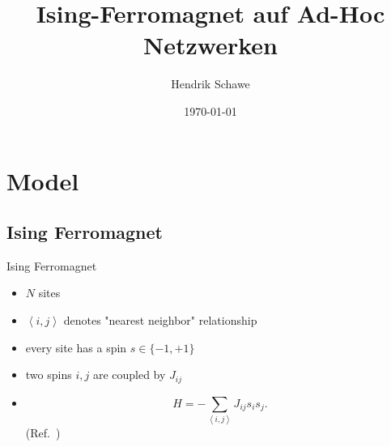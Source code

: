 \documentclass{beamer}
\title{Ising-Ferromagnet auf Ad-Hoc Netzwerken}
\author{Hendrik Schawe}
\date{\today}
\newcommand{\avg}[1]{\left< #1 \right>}
\begin{document}
\maketitle
\frame{\tableofcontents[pausesections]}

\section{Model}
    \subsection{Ising Ferromagnet}
        \begin{frame}{Ising Ferromagnet}
            \begin{itemize}[<+->]
                \item \(N\) sites
                \item \(\avg{i,j}\) denotes "nearest neighbor" relationship
                \item every site has a spin \(s \in \{-1,+1\}\){}
                \item two spins \(i,j\) are coupled by \(J_{ij}\)
                \item{
                    \begin{equation}
                        H = - \sum_{\avg{i,j}}J_{ij}s_{i}s_{j}.
                    \end{equation}
                    (Ref.\ \cite{Ising1925})
                }
            \end{itemize}
        \end{frame}
\end{document}
